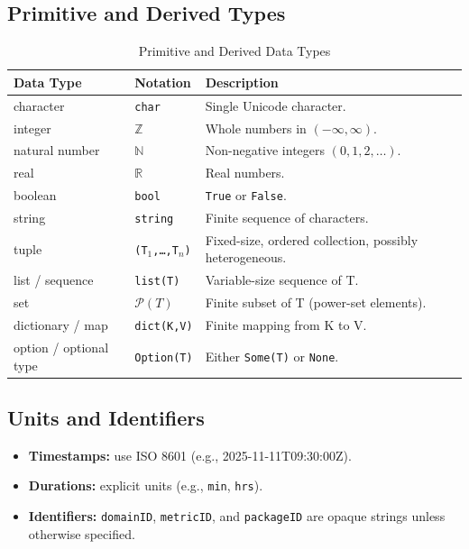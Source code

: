 \documentclass[12pt, titlepage]{article}
\begin{document}
\subsection{Primitive and Derived Types}
\label{tab:primitive-derived-types}
\begin{table}[H]
\centering
\renewcommand{\arraystretch}{1.2}
\begin{tabularx}{\textwidth}{l l X}
\toprule
\textbf{Data Type} & \textbf{Notation} & \textbf{Description} \\
\midrule
character & \texttt{char} & Single Unicode character. \\
integer & $\mathbb{Z}$ & Whole numbers in $(-\infty,\infty)$. \\
natural number & $\mathbb{N}$ & Non-negative integers $(0,1,2,\dots)$. \\
real & $\mathbb{R}$ & Real numbers. \\
boolean & \texttt{bool} & \texttt{True} or \texttt{False}. \\
string & \texttt{string} & Finite sequence of characters. \\
tuple & \texttt{(T$_1$,…,T$_n$)} & Fixed-size, ordered collection, possibly heterogeneous. \\
list / sequence & \texttt{list(T)} & Variable-size sequence of T. \\
set & $\mathcal{P}(T)$ & Finite subset of T (power-set elements). \\
dictionary / map & \texttt{dict(K,V)} & Finite mapping from K to V. \\
option / optional type & \texttt{Option(T)} & Either \texttt{Some(T)} or \texttt{None}. \\
\bottomrule
\end{tabularx}
\caption{Primitive and Derived Data Types}
\end{table}

\subsection{Units and Identifiers}

\begin{itemize}
  \item \textbf{Timestamps:} use ISO 8601 (e.g., 2025-11-11T09:30:00Z).
  \item \textbf{Durations:} explicit units (e.g., \texttt{min}, \texttt{hrs}).
  \item \textbf{Identifiers:} \texttt{domainID}, \texttt{metricID}, and \texttt{packageID} are opaque strings unless otherwise specified.
\end{itemize}
\end{document}
